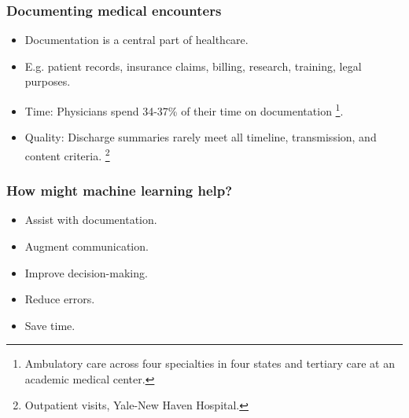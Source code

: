


\begin{frame}
    \frametitle{Documenting medical encounters}
    \begin{itemize}
        \item <1,2> Documentation is a central part of healthcare.
        \item <1,2> E.g. patient records, insurance claims, billing, research, training, legal purposes.
        \vspace{1em}
        \item <2> {\color{dtured}Time}: Physicians spend 34-37\% of their time on documentation \cite{joukes_time_2018, tipping_where_2010, sinsky_allocation_2016}\footnote{Ambulatory care across four specialties in four states and tertiary care at an academic medical center.}.
        \item <2> {\color{dtured}Quality}: Discharge summaries rarely meet all timeline, transmission, and content criteria. \cite{horwitz_comprehensive_2013}\footnote{Outpatient visits, Yale-New Haven Hospital.}
    \end{itemize}
    
\end{frame}


\begin{frame}
    \frametitle{How might machine learning help?}
    \begin{itemize}
        \item <1> {\color{dtured}Assist} with documentation.
        \item <1> {\color{dtured}Augment} communication.
        \item <1> {\color{dtured}Improve} decision-making.
        \vspace{1em}
        \item <1> {\color{dtured}Reduce} errors.
        \item <1> {\color{dtured}Save} time.
    \end{itemize}
\end{frame}


